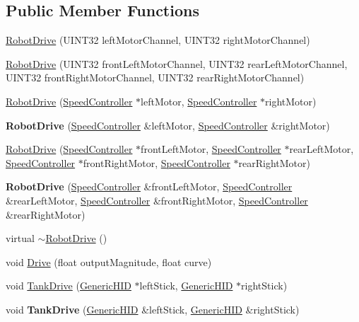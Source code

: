 \subsection*{Public Member Functions}
\begin{DoxyCompactItemize}
\item 
\hyperlink{classRobotDrive_a9cf81a481115792788aec8cb3e91b31c}{RobotDrive} (UINT32 leftMotorChannel, UINT32 rightMotorChannel)
\item 
\hyperlink{classRobotDrive_ae0892e46b7a378e546b5499ce686bef8}{RobotDrive} (UINT32 frontLeftMotorChannel, UINT32 rearLeftMotorChannel, UINT32 frontRightMotorChannel, UINT32 rearRightMotorChannel)
\item 
\hyperlink{classRobotDrive_a8acf6e6ab76d4442c9e58094147c1bd9}{RobotDrive} (\hyperlink{classSpeedController}{SpeedController} $\ast$leftMotor, \hyperlink{classSpeedController}{SpeedController} $\ast$rightMotor)
\item 
\hypertarget{classRobotDrive_a558340487b3deaf4ba919dd0b888de3c}{
{\bfseries RobotDrive} (\hyperlink{classSpeedController}{SpeedController} \&leftMotor, \hyperlink{classSpeedController}{SpeedController} \&rightMotor)}
\label{classRobotDrive_a558340487b3deaf4ba919dd0b888de3c}

\item 
\hyperlink{classRobotDrive_a47180c144fcca9e7550f7cb906c8b79a}{RobotDrive} (\hyperlink{classSpeedController}{SpeedController} $\ast$frontLeftMotor, \hyperlink{classSpeedController}{SpeedController} $\ast$rearLeftMotor, \hyperlink{classSpeedController}{SpeedController} $\ast$frontRightMotor, \hyperlink{classSpeedController}{SpeedController} $\ast$rearRightMotor)
\item 
\hypertarget{classRobotDrive_a98d8c91f1e9d960c9b7396638927d4b1}{
{\bfseries RobotDrive} (\hyperlink{classSpeedController}{SpeedController} \&frontLeftMotor, \hyperlink{classSpeedController}{SpeedController} \&rearLeftMotor, \hyperlink{classSpeedController}{SpeedController} \&frontRightMotor, \hyperlink{classSpeedController}{SpeedController} \&rearRightMotor)}
\label{classRobotDrive_a98d8c91f1e9d960c9b7396638927d4b1}

\item 
virtual \hyperlink{classRobotDrive_afb1b0e87856dca22c13a4baed8ab6059}{$\sim$RobotDrive} ()
\item 
void \hyperlink{classRobotDrive_a00f3c6f7906685fe2f98ceaa8bb7e188}{Drive} (float outputMagnitude, float curve)
\item 
void \hyperlink{classRobotDrive_a47df0f6d6a60ab9fe99cf5e953f06d76}{TankDrive} (\hyperlink{classGenericHID}{GenericHID} $\ast$leftStick, \hyperlink{classGenericHID}{GenericHID} $\ast$rightStick)
\item 
\hypertarget{classRobotDrive_ac8b4d83072ebb285a2682cf73f52e6b2}{
void {\bfseries TankDrive} (\hyperlink{classGenericHID}{GenericHID} \&leftStick, \hyperlink{classGenericHID}{GenericHID} \&rightStick)}
\label{classRobotDrive_ac8b4d83072ebb285a2682cf73f52e6b2}


\end{DoxyCompactItemize}
